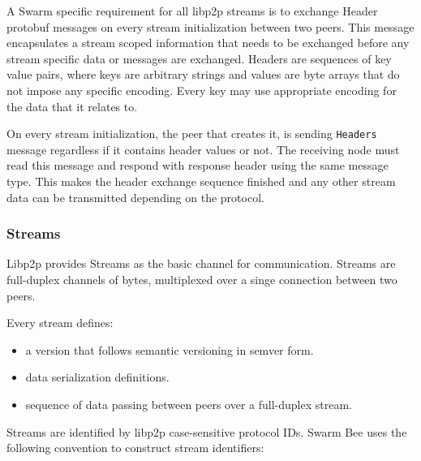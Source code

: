 A Swarm specific requirement for all libp2p streams is to exchange
Header protobuf messages on every stream initialization between two
peers. This message encapsulates a stream scoped information that needs
to be exchanged before any stream specific data or messages are
exchanged. Headers are sequences of key value pairs, where keys are
arbitrary strings and values are byte arrays that do not impose any
specific encoding. Every key may use appropriate encoding for the data
that it relates to.
\begin{Shaded}
\begin{Highlighting}[]
\NormalTok{;}


    \NormalTok{;}
\NormalTok{\}}

  \NormalTok{;}
  \NormalTok{;}
\NormalTok{\}}
\end{Highlighting}
\end{Shaded}

On every stream initialization, the peer that creates it, is sending
\texttt{Headers} message regardless if it contains header values or not.
The receiving node must read this message and respond with response
header using the same message type. This makes the header exchange
sequence finished and any other stream data can be transmitted depending
on the protocol.

\subsubsection{Streams}\label{streams}

Libp2p provides Streams as the basic channel for communication. Streams are full-duplex channels of bytes, multiplexed over a singe connection between two peers.

Every stream defines:
\begin{itemize}
    \item a version that follows semantic versioning in semver form.
    \item data serialization definitions.
    \item sequence of data passing between peers over a full-duplex stream.
\end{itemize}
Streams are identified by libp2p case-sensitive protocol IDs. Swarm Bee uses the following convention to construct stream identifiers:

